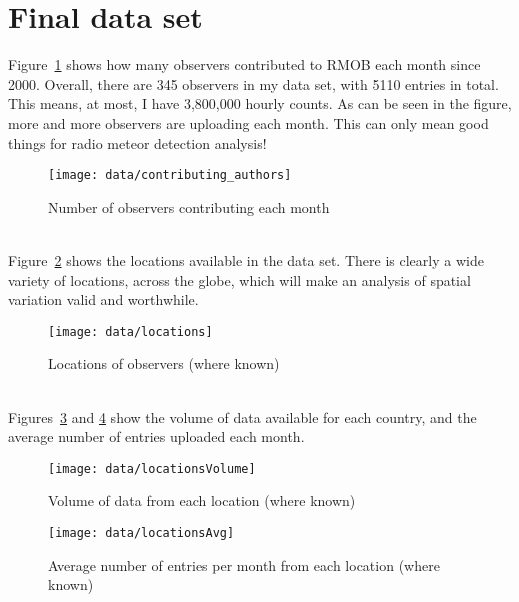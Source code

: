 \section{Final data set}
Figure~\ref{fig:data:contr} shows how many observers contributed to RMOB each month since 2000. Overall, there are 345 observers in my data set, with 5110 entries in total. This means, at most, I have 3,800,000 hourly counts. As can be seen in the figure, more and more observers are uploading each month. This can only mean good things for radio meteor detection analysis!
\begin{figure}[h!]
	\centering
	\texttt{[image: data/contributing\_authors]}
	\caption{Number of observers contributing each month
		\label{fig:data:contr}}
\end{figure}\\
Figure~\ref{fig:data:loc} shows the locations available in the data set. There is clearly a wide variety of locations, across the globe, which will make an analysis of spatial variation valid and worthwhile. 
\begin{figure}[h!]
	\centering
	\texttt{[image: data/locations]}
	\caption{Locations of observers (where known)
		\label{fig:data:loc}}
\end{figure}\\
Figures~\ref{fig:data:locvol} and \ref{fig:data:locavg} show the volume of data available for each country, and the average number of entries uploaded each month.
\begin{figure}[h!]
	\centering
	\texttt{[image: data/locationsVolume]}
	\caption{Volume of data from each location (where known)
		\label{fig:data:locvol}}
\end{figure}
\begin{figure}[h!]
	\centering
	\texttt{[image: data/locationsAvg]}
	\caption{Average number of entries per month from each location (where known)
		\label{fig:data:locavg}}
\end{figure}